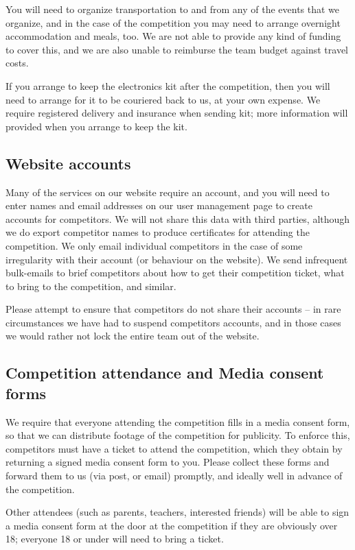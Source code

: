 \documentclass[a4paper]{article}
\begin{document}
You will need to organize transportation to and from any of the events that we
organize, and in the case of the competition you may need to arrange overnight
accommodation and meals, too. We are not able to provide any kind of funding to
cover this, and we are also unable to reimburse the team budget against travel
costs.

If you arrange to keep the electronics kit after the competition, then you will
need to arrange for it to be couriered back to us, at your own expense. We
require registered delivery and insurance when sending kit; more information
will provided when you arrange to keep the kit.

\subsection*{Website accounts}

Many of the services on our website require an account, and you will need to
enter names and email addresses on our user management page to create accounts
for competitors. We will not share this data with third parties, although we do
export competitor names to produce certificates for attending the competition.
We only email individual competitors in the case of some irregularity with
their account (or behaviour on the website). We send infrequent bulk-emails
to brief competitors about how to get their competition ticket, what to bring
to the competition, and similar.

Please attempt to ensure that competitors do not share their accounts -- in rare
circumstances we have had to suspend competitors accounts, and in those cases
we would rather not lock the entire team out of the website.

\subsection*{Competition attendance and Media consent forms}
 
We require that everyone attending the competition fills in a media consent
form, so that we can distribute footage of the competition for publicity.
To enforce this, competitors must have a ticket to attend the competition,
which they obtain by returning a signed media consent form to you. Please
collect these forms and forward them to us (via post, or email) promptly,
and ideally well in advance of the competition.

Other attendees (such as parents, teachers, interested friends) will be able
to sign a media consent form at the door at the competition if they are
obviously over 18; everyone 18 or under will need to bring a ticket.
\end{document}
